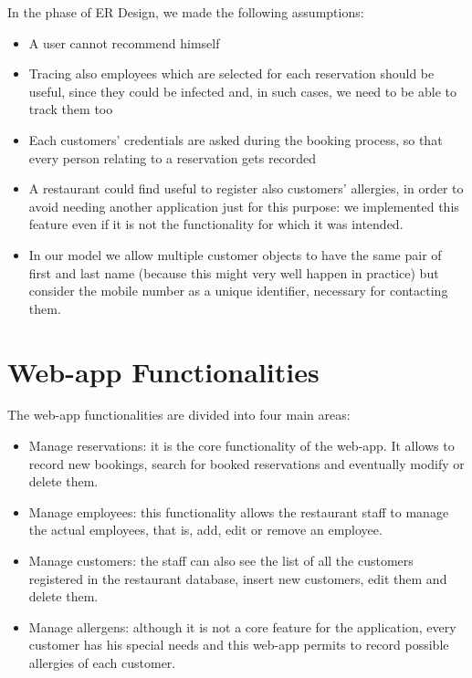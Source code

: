 \documentclass{article}
\begin{document}
\vspace{5mm}
In the phase of ER Design, we made the following assumptions:
\begin{itemize}
  \item A user cannot recommend himself
  \item Tracing also employees which are selected for each reservation should be useful, since they could be infected and, in such cases, we need to be able to track them too
  \item Each customers' credentials are asked during the booking process, so that every person relating to a reservation gets recorded
  \item A restaurant could find useful to register also customers' allergies, 
  in order to avoid needing another application just for this purpose: we implemented this feature even if it is not the functionality for which it was intended.
  \item In our model we allow multiple customer objects to have the same pair of
  first and last name (because this might very well happen in practice) but consider
  the mobile number as a unique identifier, necessary for contacting them.
\end{itemize}


    \newpage

    \section*{Web-app Functionalities}
    The web-app functionalities are divided into four main areas:
    \begin{itemize}
        \item Manage reservations: it is the core functionality of the web-app. It allows
        to record new bookings, search for booked reservations and eventually
        modify or delete them.
        \item Manage employees: this functionality allows the restaurant staff to manage the actual employees, that is, add, edit or remove an employee.
        \item Manage customers: the staff can also see the list of all the customers registered in the restaurant database, insert new customers, edit them and delete them.
        \item Manage allergens: although it is not a core feature for the application, every customer has his special needs and this web-app permits to record possible allergies of each customer.
    \end{itemize}
\end{document}
